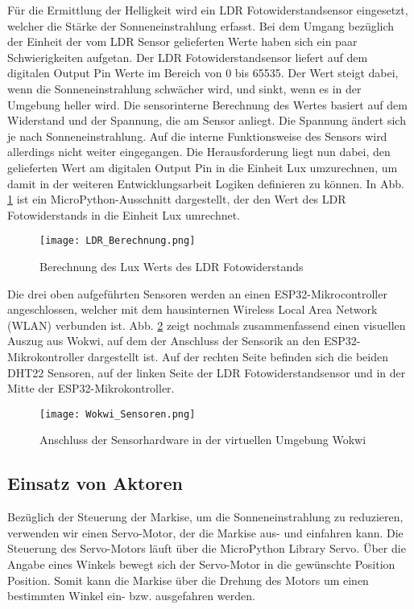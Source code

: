 Für die Ermittlung der Helligkeit wird ein LDR Fotowiderstandsensor eingesetzt, welcher die Stärke der Sonneneinstrahlung erfasst. Bei dem Umgang bezüglich der Einheit der vom LDR Sensor gelieferten Werte haben sich ein paar Schwierigkeiten aufgetan. Der LDR Fotowiderstandsensor liefert auf dem digitalen Output Pin Werte im Bereich von 0 bis 65535. Der Wert steigt dabei, wenn die Sonneneinstrahlung schwächer wird, und sinkt, wenn es in der Umgebung heller wird. Die sensorinterne Berechnung des Wertes basiert auf dem Widerstand und der Spannung, die am Sensor anliegt. Die Spannung ändert sich je nach Sonneneinstrahlung. Auf die interne Funktionsweise des Sensors wird allerdings nicht weiter eingegangen. Die Herausforderung liegt nun dabei, den gelieferten Wert am digitalen Output Pin in die Einheit Lux umzurechnen, um damit in der weiteren Entwicklungsarbeit Logiken definieren zu können. In Abb. \ref{fig:LDR_Berechnung} ist ein MicroPython-Ausschnitt dargestellt, der den Wert des LDR Fotowiderstands in die Einheit Lux umrechnet.

\begin{figure}[h]
    \centering
    \texttt{[image: LDR\_Berechnung.png]}
    \caption{Berechnung des Lux Werts des LDR Fotowiderstands}\label{fig:LDR_Berechnung}
\end{figure}

Die drei oben aufgeführten Sensoren werden an einen ESP32-Mikrocontroller angeschlossen, welcher mit dem hausinternen Wireless Local Area Network (WLAN) verbunden ist. Abb. \ref{fig:wokwi_sensoren} zeigt nochmals zusammenfassend einen visuellen Auszug aus Wokwi, auf dem der Anschluss der Sensorik an den ESP32-Mikrokontroller dargestellt ist. Auf der rechten Seite befinden sich die beiden DHT22 Sensoren, auf der linken Seite der LDR Fotowiderstandsensor und in der Mitte der ESP32-Mikrokontroller.

\begin{figure}[h]
    \centering
    \texttt{[image: Wokwi\_Sensoren.png]}
    \caption{Anschluss der Sensorhardware in der virtuellen Umgebung Wokwi}\label{fig:wokwi_sensoren}
\end{figure}

\subsection{Einsatz von Aktoren}
Bezüglich der Steuerung der Markise, um die Sonneneinstrahlung zu reduzieren, verwenden wir einen Servo-Motor, der die Markise aus- und einfahren kann. Die Steuerung des Servo-Motors läuft über die MicroPython Library Servo. Über die Angabe eines Winkels bewegt sich der Servo-Motor in die gewünschte Position Position. Somit kann die Markise über die Drehung des Motors um einen bestimmten Winkel ein- bzw. ausgefahren werden.

